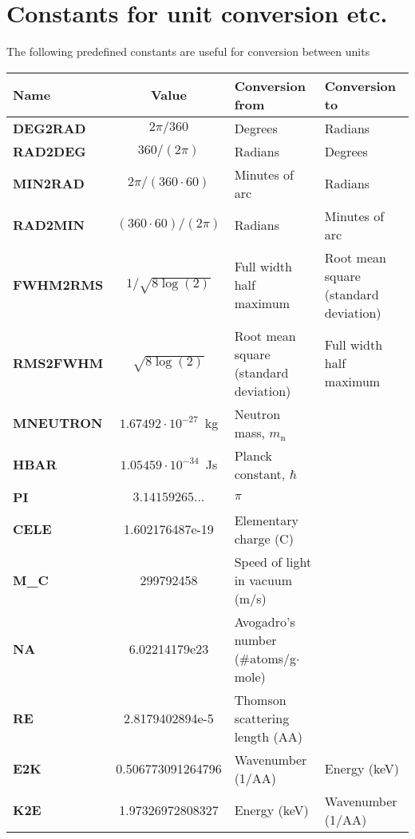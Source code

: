 \section{Constants for unit conversion etc.}
The following predefined constants are useful for conversion
between units
\def\textvb{\textbf}
\begin{center}
\begin{tabular}{|l|c|p{}|p{}|}
\hline
Name & Value & Conversion from & Conversion to \\ \hline
\textvb{DEG2RAD} & $2 \pi / 360$ & Degrees & Radians \\
\textvb{RAD2DEG} & $360 / (2 \pi)$ & Radians & Degrees \\
\textvb{MIN2RAD} & $2 \pi / (360 \cdot 60)$
  & Minutes of arc & Radians \\
\textvb{RAD2MIN} & $(360\cdot 60) / (2 \pi)$
  & Radians & Minutes of arc \\
\textvb{FWHM2RMS} & $1/\sqrt{8\log(2)}$
  & Full width half maximum & Root mean square (standard deviation) \\
\textvb{RMS2FWHM} & $\sqrt{8\log(2)}$
  & Root mean square (standard deviation) & Full width half maximum \\
\textvb{MNEUTRON} & $1.67492 \cdot 10^{-27}$~kg
  & Neutron mass, $m_\mathrm{n}$ & \\
\textvb{HBAR} & $1.05459 \cdot 10^{-34}$~Js
  & Planck constant, $\hbar$ & \\
\textvb{PI} & $3.14159265...$
  & $\pi$ & \\
\textvb{CELE} & 1.602176487e-19 & Elementary charge (C) &\\
\textvb{M\_C} & 299792458 & Speed of light in vacuum (m/s) &\\
\textvb{NA} & 6.02214179e23 &  Avogadro's number (\#atoms/g$\cdot$mole)&\\
\textvb{RE} & 2.8179402894e-5 &  Thomson scattering length (AA)&\\
\textvb{E2K} & 0.506773091264796 & Wavenumber (1/AA) & Energy (keV)\\
\textvb{K2E} & 1.97326972808327  & Energy (keV) & Wavenumber (1/AA)\\


\hline
\end{tabular}
\end{center}
